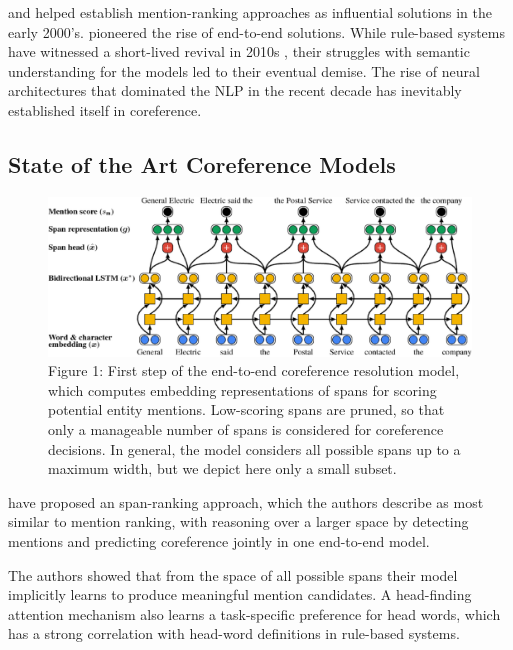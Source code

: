 \documentclass[11pt]{article}
\begin{document}
\textcite{yang2003coref} and \textcite{iida2003incorporating} helped establish mention-ranking approaches as influential solutions in the early 2000's. \textcite{ng2005b} pioneered the rise of end-to-end solutions. While rule-based systems have witnessed a short-lived revival in 2010s \parencite{zhou2004, haghighi2009}, their struggles with semantic understanding for the models led to their eventual demise.  The rise of neural architectures that dominated the NLP in the recent decade has inevitably established itself in coreference. 

\subsection{State of the Art Coreference Models}

\begin{figure}[h]
  \includegraphics[width=\textwidth]{e2emodel.eps}
  \caption{Figure 1: First step of the end-to-end coreference resolution model, which computes embedding representations of spans for scoring potential entity mentions. Low-scoring spans are pruned, so that only a manageable number of spans is considered for coreference decisions. In general, the model considers all possible spans up to a maximum width, but we depict here only a small subset. \parencite{lee2017end}}
  \label{fig:e2emodel}
\end{figure}

\textcite{lee2017end} have proposed an span-ranking approach, which the authors describe as most similar to mention ranking, with reasoning over a larger space by detecting mentions and predicting coreference jointly in one end-to-end model. 


The authors showed that from the space of all possible spans their model implicitly  learns to produce meaningful mention candidates. A head-finding attention mechanism also learns a task-specific preference for head words, which has a strong correlation with head-word definitions in rule-based systems.
\end{document}

